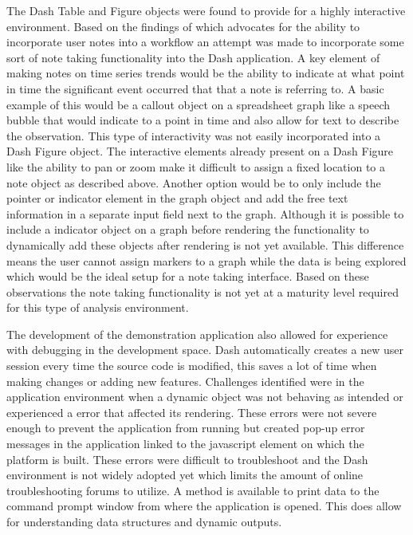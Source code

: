 The Dash Table and Figure objects were found to provide for a highly interactive environment. Based on the findings of \cite{mahyar2010closer} which advocates for the ability to incorporate user notes into a workflow an attempt was made to incorporate some sort of note taking functionality into the Dash application. A key element of making notes on time series trends would be the ability to indicate at what point in time the significant event occurred that that a note is referring to. A basic example of this would be a callout object on a spreadsheet graph like a speech bubble that would indicate to a point in time and also allow for text to describe the observation. This type of interactivity was not easily incorporated into a Dash Figure object. The interactive elements already present on a Dash Figure like the ability to pan or zoom make it difficult to assign a fixed location to a note object as described above. Another option would be to only include the pointer or indicator element in the graph object and add the free text information in a separate input field next to the graph. Although it is possible to include a indicator object on a graph before rendering the functionality to dynamically add these objects after rendering is not yet available. This difference means the user cannot assign markers to a graph while the data is being explored which would be the ideal setup for a note taking interface. Based on these observations the note taking functionality is not yet at a maturity level required for this type of analysis environment.

The development of the demonstration application also allowed for experience with debugging in the development space. Dash automatically creates a new user session every time the source code is modified, this saves a lot of time when making changes or adding new features. Challenges identified were in the application environment when a dynamic object was not behaving as intended or experienced a error that affected its rendering. These errors were not severe enough to prevent the application from running but created pop-up error messages in the application linked to the javascript element on which the platform is built. These errors were difficult to troubleshoot and the Dash environment is not widely adopted yet which limits the amount of online troubleshooting forums to utilize. A method is available to print data to the command prompt window from where the application is opened. This does allow for understanding data structures and dynamic outputs.

